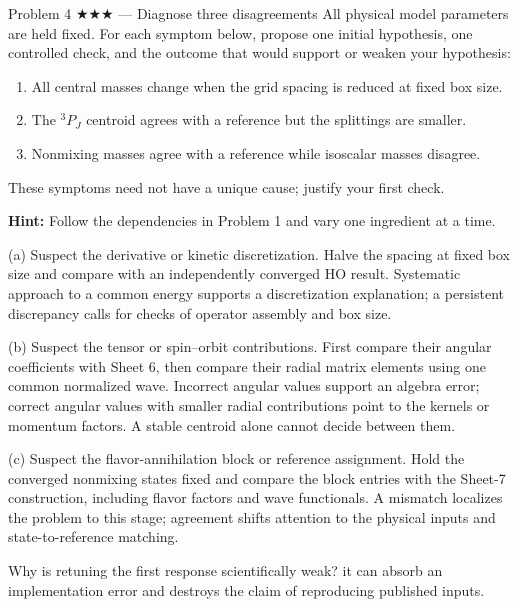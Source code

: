 \documentclass[11pt]{article}
\begin{document}
\begin{problem}{Problem 4 ★★★ — Diagnose three disagreements}
All physical model parameters are held fixed. For each symptom below,
propose one initial hypothesis, one controlled check, and the outcome that
would support or weaken your hypothesis:
\begin{enumerate}[label=(\alph*)]
\item All central masses change when the grid spacing is reduced at fixed box size.
\item The $^3P_J$ centroid agrees with a reference but the splittings are smaller.
\item Nonmixing masses agree with a reference while isoscalar masses disagree.
\end{enumerate}
These symptoms need not have a unique cause; justify your first check.

\textbf{Hint:} Follow the dependencies in Problem 1 and vary one ingredient at a time.
\end{problem}
\begin{solution}
(a) Suspect the derivative or kinetic discretization. Halve the spacing at
fixed box size and compare with an independently converged HO result.
Systematic approach to a common energy supports a discretization explanation;
a persistent discrepancy calls for checks of operator assembly and box size.

(b) Suspect the tensor or spin--orbit contributions. First compare their
angular coefficients with Sheet 6, then compare their radial matrix elements
using one common normalized wave. Incorrect angular values support an algebra
error; correct angular values with smaller radial contributions point to the
kernels or momentum factors. A stable centroid alone cannot decide between them.

(c) Suspect the flavor-annihilation block or reference assignment.
Hold the converged nonmixing states fixed and compare the block entries with
the Sheet-7 construction, including flavor factors and wave functionals.
A mismatch localizes the problem to this stage; agreement shifts attention
to the physical inputs and state-to-reference matching.
\end{solution}
\begin{quiz}
Why is retuning the first response scientifically weak? \answer it can absorb
an implementation error and destroys the claim of reproducing published inputs.
\end{quiz}
\end{document}
